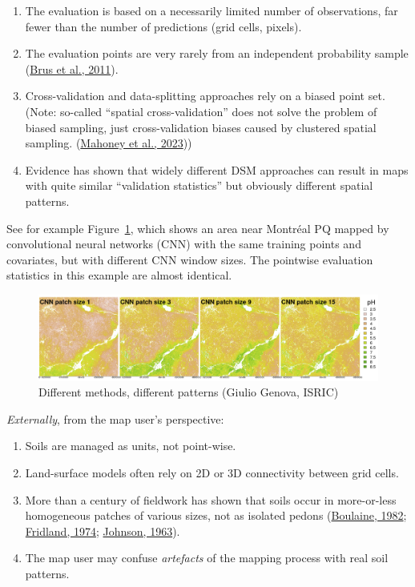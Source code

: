 \documentclass[
  letterpaper,
  DIV=11,
  numbers=noendperiod]{scrartcl}
\providecommand{\tightlist}{%
  \setlength{\itemsep}{0pt}\setlength{\parskip}{0pt}}\usepackage{longtable,booktabs,array}
\begin{document}
\begin{enumerate}
\def\labelenumi{\arabic{enumi}.}
\tightlist
\item
  The evaluation is based on a necessarily limited number of
  observations, far fewer than the number of predictions (grid cells,
  pixels).
\item
  The evaluation points are very rarely from an independent probability
  sample (\protect\hyperlink{ref-Brus.etal2011}{Brus et al., 2011}).
\item
  Cross-validation and data-splitting approaches rely on a biased point
  set. (Note: so-called ``spatial cross-validation'' does not solve the
  problem of biased sampling, just cross-validation biases caused by
  clustered spatial sampling.
  (\protect\hyperlink{ref-mahoneyAssessingPerformanceSpatial2023}{Mahoney
  et al., 2023}))
\item
  Evidence has shown that widely different DSM approaches can result in
  maps with quite similar ``validation statistics'' but obviously
  different spatial patterns.
\end{enumerate}

See for example Figure~\ref{fig-genova}, which shows an area near
Montréal PQ mapped by convolutional neural networks (CNN) with the same
training points and covariates, but with different CNN window sizes. The
pointwise evaluation statistics in this example are almost identical.

\begin{figure}

{\centering \includegraphics{./figs/GenovaPosterFig1a.png}

}

\caption{\label{fig-genova}Different methods, different patterns (Giulio
Genova, ISRIC)}

\end{figure}

\emph{Externally}, from the map user's perspective:

\begin{enumerate}
\def\labelenumi{\arabic{enumi}.}
\tightlist
\item
  Soils are managed as units, not point-wise.
\item
  Land-surface models often rely on 2D or 3D connectivity between grid
  cells.
\item
  More than a century of fieldwork has shown that soils occur in
  more-or-less homogeneous patches of various sizes, not as isolated
  pedons
  (\protect\hyperlink{ref-boulaineRemarquesQuelquesNotions1982}{Boulaine,
  1982}; \protect\hyperlink{ref-Fridland1974}{Fridland, 1974};
  \protect\hyperlink{ref-johnsonPedonPolypedon1963}{Johnson, 1963}).
\item
  The map user may confuse \emph{artefacts} of the mapping process with
  real soil patterns.
\end{enumerate}
\end{document}
